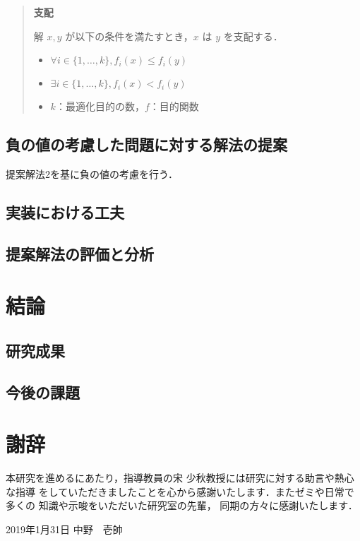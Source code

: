 \documentclass[12pt]{optlab-bachelor}
\def\氏名{中野　壱帥}
\renewcommand{\bibname}{参考文献}
\begin{document}
\begin{quote}
  \textbf{支配}

    解 $x,y$ が以下の条件を満たすとき，$x$ は $y$ を支配する．
    \begin{itemize}
      \item $\forall i \in \{1,\ldots,k\},f_i(x) \le f_i(y)$
      \item $\exists i \in \{1,\ldots,k\},f_i(x) < f_i(y)$
      \item $k$：最適化目的の数，$f$：目的関数
    \end{itemize}
\end{quote}

\section{負の値の考慮した問題に対する解法の提案}
提案解法2を基に負の値の考慮を行う．

\section{実装における工夫}

\section{提案解法の評価と分析}

\chapter{結論}

\section{研究成果}

\section{今後の課題}

% 
% 

\chapter*{謝辞}
本研究を進めるにあたり，指導教員の宋 少秋教授には研究に対する助言や熱心な指導
をしていただきましたことを心から感謝いたします．またゼミや日常で多くの
知識や示唆をいただいた研究室の先輩，
同期の方々に感謝いたします．

\begin{flushright}
  2019年1月31日 \氏名
\end{flushright}
\endmatter %
\end{document}

